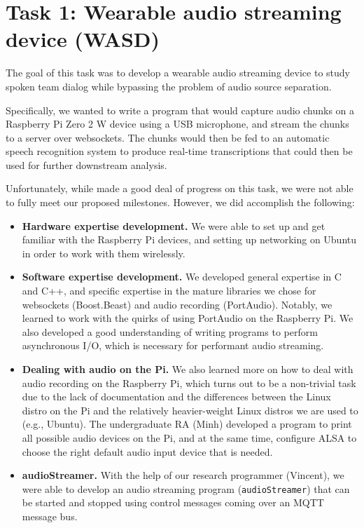 \section{Task 1: Wearable audio streaming device (WASD)}

The goal of this task was to develop a wearable audio streaming device to
study spoken team dialog while bypassing the problem of audio source
separation.

Specifically, we wanted to write a program that would capture audio chunks on a
Raspberry Pi Zero 2 W device using a USB microphone, and stream the chunks to a
server over websockets. The chunks would then be fed to an automatic speech
recognition system to produce real-time transcriptions that could then be used
for further downstream analysis.

Unfortunately, while made a good deal of progress on this task, we were not
able to fully meet our proposed milestones. However, we did accomplish the
following:


\begin{itemize}
    \item \textbf{Hardware expertise development.} We were able to set up and get familiar with the Raspberry Pi
        devices, and setting up networking on Ubuntu in order to work with them
        wirelessly.

    \item \textbf{Software expertise development.} We developed general
        expertise in C and C++, and specific expertise in the mature libraries
        we chose for websockets (Boost.Beast) and audio recording (PortAudio).
        Notably, we learned to work with the quirks of using PortAudio on the
        Raspberry Pi.  We also developed a good understanding of writing
        programs to perform asynchronous I/O, which is necessary for performant
        audio streaming.

    \item \textbf{Dealing with audio on the Pi.} We also learned more on how to
        deal with audio recording on the Raspberry Pi, which turns out to be a
        non-trivial task due to the lack of documentation and the differences
        between the Linux distro on the Pi and the relatively heavier-weight
        Linux distros we are used to (e.g., Ubuntu).
        The undergraduate RA (Minh) developed a program to print all possible audio
        devices on the Pi, and at the same time, configure ALSA to choose the
        right default audio input device that is needed.

    \item \textbf{audioStreamer.} With the help of our research programmer
        (Vincent), we were able to develop an audio streaming program
        (\texttt{audioStreamer}) that can be started and stopped using control
        messages coming over an MQTT message bus. 

\end{itemize}

